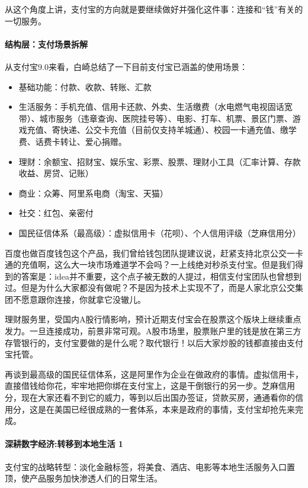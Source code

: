 \documentclass[letterpaper,11pt,english]{sphinxmanual}
\begin{document}
从这个角度上讲，支付宝的方向就是要继续做好并强化这件事：连接和“钱”有关的一切服务。


\paragraph{结构层：支付场景拆解}
\label{\detokenize{chapter_company/alipay:id6}}
从支付宝9.0来看，白崎总结了一下目前支付宝已涵盖的使用场景：
\begin{itemize}
\item {} 
基础功能：付款、收款、转账、汇款

\item {} 
生活服务：手机充值、信用卡还款、外卖、生活缴费（水电燃气电视固话宽带）、城市服务（违章查询、医院挂号等）、电影、打车、机票、景区门票、游戏充值、寄快递、公交卡充值（目前仅支持羊城通）、校园一卡通充值、缴学费、话费卡转让、爱心捐赠。

\item {} 
理财：余额宝、招财宝、娱乐宝、彩票、股票、理财小工具（汇率计算、存款收益、房贷、记账）

\item {} 
商业：众筹、阿里系电商（淘宝、天猫）

\item {} 
社交：红包、亲密付

\item {} 
国民征信体系（最高级）：虚拟信用卡（花呗）、个人信用评级（芝麻信用分）

\end{itemize}

百度也做百度钱包这个产品，我们曾给钱包团队提建议说，赶紧支持北京公交一卡通的充值啊，这么大一块市场难道学不会吗？一上线绝对秒杀支付宝。但是我们得到的答案是：idea并不重要，这个点子被无数的人提过，相信支付宝团队也曾想到过。但是为什么大家都没有做呢？不是因为技术上实现不了，而是人家北京公交集团不愿意跟你连接，你就拿它没辙儿。

理财服务里，受国内A股行情影响，预计近期支付宝会在股票这个版块上继续重点发力。一旦连接成功，前景非常可观。A股市场里，股票账户里的钱是放在第三方存管银行的，支付宝要做的是什么呢？取代银行！以后大家炒股的钱都直接由支付宝托管。

再谈到最高级的国民征信体系，这是阿里作为企业在做政府的事情。虚拟信用卡，直接借钱给你花，牢牢地把你绑在支付宝上，这是干倒银行的另一步。芝麻信用分，现在大家还看不到它的威力，等到以后出国办签证，贷款买房，通通看你的信用分，这是在美国已经很成熟的一套体系，本来是政府的事情，支付宝却抢先来完成。


\paragraph{深耕数字经济:转移到本地生活 1\sphinxfootnotemark[877]}
\label{\detokenize{chapter_company/alipay:id7}}%
\begin{footnotetext}[877]\sphinxAtStartFootnote
{}
%
\end{footnotetext}\ignorespaces 
支付宝的战略转型：淡化金融标签，将美食、酒店、电影等本地生活服务入口置顶，使产品服务加快渗透人们的日常生活。
\end{document}
